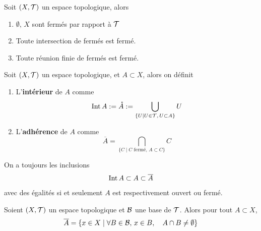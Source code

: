 \begin{proposition}
	Soit $(X, \mathcal T)$ un espace topologique, alors
	\begin{enumerate}
		\item $\emptyset, \, X$ sont fermés par rapport à $\mathcal T$
		\item Toute intersection de fermés est fermé.
		\item Toute réunion finie de fermés est fermé.
	\end{enumerate}
\end{proposition}


\begin{definition}
	Soit $(X, \mathcal T)$ un espace topologique, et $A \subset X$, alors on définit
	\begin{enumerate}
		\item L'\textbf{intérieur} de $A$ comme
		\[
		\operatorname{Int} A := \mathring A := \bigcup_{\{U \mid U \in \mathcal T, \, U \subset A\}} U
		\]
		\item L'\textbf{adhérence} de $A$ comme
		\[
		\overline A = \bigcap_{ \{C \mid C \text{ fermé}, \, A \subset C\}} C 
		\]
	\end{enumerate}
\end{definition}

\begin{remarque}
	On a toujours les inclusions
	\[
	\operatorname{Int} A \subset A \subset \overline A 
	\]
	avec des égalités si et seulement $A$ est respectivement ouvert ou fermé.
\end{remarque}


\begin{theoreme}
	Soient $(X, \mathcal T)$ un espace topologique et $\mathcal B$ une base de $\mathcal T$. Alors pour tout $A \subset X$,
	\[
	\overline A = \{x \in X \mid \forall B \in \mathcal B, \, x \in B, \quad A \cap B \neq \emptyset\}
	\]
\end{theoreme}


